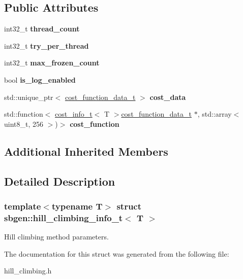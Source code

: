 \subsection*{Public Attributes}
\begin{DoxyCompactItemize}
\item 
\mbox{\label{structsbgen_1_1hill__climbing__info__t_a0188a70c1c153d28187dab52a1d0668a}} 
int32\+\_\+t {\bfseries thread\+\_\+count}
\item 
\mbox{\label{structsbgen_1_1hill__climbing__info__t_a4de61389eaf0c78e0cf5d0b34e21c6a8}} 
int32\+\_\+t {\bfseries try\+\_\+per\+\_\+thread}
\item 
\mbox{\label{structsbgen_1_1hill__climbing__info__t_aaca1008c5f6e43bc993dddb82a9dfef2}} 
int32\+\_\+t {\bfseries max\+\_\+frozen\+\_\+count}
\item 
\mbox{\label{structsbgen_1_1hill__climbing__info__t_adeb959945ae0d3283ddd080c5293e44c}} 
bool {\bfseries is\+\_\+log\+\_\+enabled}
\item 
\mbox{\label{structsbgen_1_1hill__climbing__info__t_ab342c8e78df5d87861779369ed0e4e17}} 
std\+::unique\+\_\+ptr$<$ \hyperlink{classsbgen_1_1cost__function__data__t}{cost\+\_\+function\+\_\+data\+\_\+t} $>$ {\bfseries cost\+\_\+data}
\item 
\mbox{\label{structsbgen_1_1hill__climbing__info__t_a76c5fcf82c02687e50f3751537bb8228}} 
std\+::function$<$ \hyperlink{structsbgen_1_1cost__info__t}{cost\+\_\+info\+\_\+t}$<$ T $>$\hyperlink{classsbgen_1_1cost__function__data__t}{cost\+\_\+function\+\_\+data\+\_\+t} $\ast$, std\+::array$<$ uint8\+\_\+t, 256 $>$)$>$ {\bfseries cost\+\_\+function}
\end{DoxyCompactItemize}
\subsection*{Additional Inherited Members}


\subsection{Detailed Description}
\subsubsection*{template$<$typename T$>$\newline
struct sbgen\+::hill\+\_\+climbing\+\_\+info\+\_\+t$<$ T $>$}

Hill climbing method parameters. 

The documentation for this struct was generated from the following file\+:\begin{DoxyCompactItemize}
\item 
hill\+\_\+climbing.\+h\end{DoxyCompactItemize}
